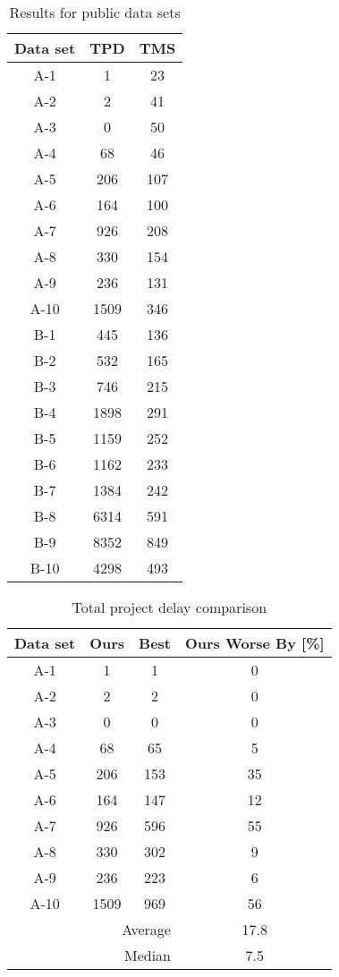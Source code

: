 \documentclass[draft]{svjour3}
\begin{document}
\begin{table}
\caption{Results for public data sets}
\centering
\begin{tabular}{c||c|c}
Data set & TPD & TMS \\ 
\hline 
\hline 
A-1 & 1 & 23 \\ 
\hline 
A-2 & 2 & 41 \\ 
\hline 
A-3 & 0 & 50 \\ 
\hline 
A-4 & 68 & 46 \\ 
\hline 
A-5 & 206 & 107 \\ 
\hline 
A-6 & 164 & 100 \\ 
\hline 
A-7 & 926 & 208 \\ 
\hline 
A-8 & 330 & 154 \\ 
\hline 
A-9 & 236 & 131 \\ 
\hline 
A-10 & 1509 & 346\\ 
\hline 
B-1 & 445 & 136\\ 
\hline 
B-2 & 532 & 165\\ 
\hline 
B-3 & 746 & 215\\ 
\hline 
B-4 & 1898 & 291\\ 
\hline 
B-5 & 1159 & 252\\ 
\hline 
B-6 & 1162 & 233\\ 
\hline 
B-7 & 1384 & 242\\
\hline 
B-8 & 6314 & 591\\ 
\hline 
B-9 & 8352 & 849\\ 
\hline 
B-10 & 4298 & 493\\ 
\end{tabular} 
\label{table:results}
\end{table}

\begin{table}
\caption{Total project delay comparison}
\centering
\begin{tabular}{c||c|c||c}
Data set & Ours & Best & Ours Worse By [\%]\\ 
\hline 
\hline 
A-1 & 1 & 1 & 0\\ 
\hline 
A-2 & 2 & 2 & 0\\ 
\hline 
A-3 & 0 & 0 & 0\\ 
\hline 
A-4 & 68 & 65 & 5\\ 
\hline 
A-5 & 206 & 153 & 35\\ 
\hline 
A-6 & 164 & 147 & 12\\ 
\hline 
A-7 & 926 & 596 & 55\\ 
\hline 
A-8 & 330 & 302 & 9\\ 
\hline 
A-9 & 236 & 223 & 6\\ 
\hline 
A-10 & 1509 & 969 & 56\\
\hline 
\hline 
\multicolumn{3}{r||}{Average} & 17.8 \\ 
\multicolumn{3}{r||}{Median} & 7.5 \\ 
\end{tabular} 
\label{table:comparison}
\end{table}
\end{document}

